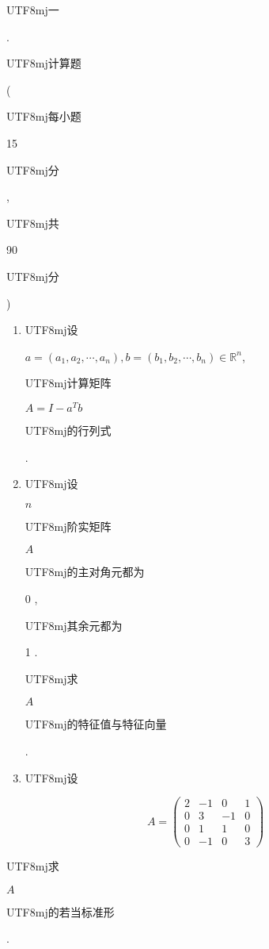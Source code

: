 \documentclass[10pt]{article}
\begin{document}
\begin{CJK}{UTF8}{mj}一\end{CJK}. \begin{CJK}{UTF8}{mj}计算题\end{CJK} (\begin{CJK}{UTF8}{mj}每小题\end{CJK} 15 \begin{CJK}{UTF8}{mj}分\end{CJK}, \begin{CJK}{UTF8}{mj}共\end{CJK} 90 \begin{CJK}{UTF8}{mj}分\end{CJK})

\begin{enumerate}
  \item \begin{CJK}{UTF8}{mj}设\end{CJK} $a=\left(a_{1}, a_{2}, \cdots, a_{n}\right), b=\left(b_{1}, b_{2}, \cdots, b_{n}\right) \in \mathbb{R}^{n}$, \begin{CJK}{UTF8}{mj}计算矩阵\end{CJK} $A=I-a^{T} b$ \begin{CJK}{UTF8}{mj}的行列式\end{CJK}.

  \item \begin{CJK}{UTF8}{mj}设\end{CJK} $n$ \begin{CJK}{UTF8}{mj}阶实矩阵\end{CJK} $A$ \begin{CJK}{UTF8}{mj}的主对角元都为\end{CJK} 0 , \begin{CJK}{UTF8}{mj}其余元都为\end{CJK} 1 . \begin{CJK}{UTF8}{mj}求\end{CJK} $A$ \begin{CJK}{UTF8}{mj}的特征值与特征向量\end{CJK}.

  \item \begin{CJK}{UTF8}{mj}设\end{CJK}

\end{enumerate}
$$
A=\left(\begin{array}{cccc}
2 & -1 & 0 & 1 \\
0 & 3 & -1 & 0 \\
0 & 1 & 1 & 0 \\
0 & -1 & 0 & 3
\end{array}\right)
$$
\begin{CJK}{UTF8}{mj}求\end{CJK} $A$ \begin{CJK}{UTF8}{mj}的若当标准形\end{CJK}.
\end{document}
